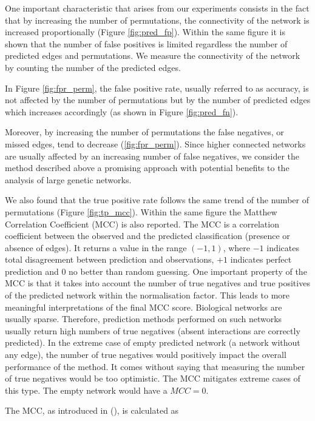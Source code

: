 One important characteristic that arises from our experiments consists in the fact that by increasing the number of permutations, the connectivity of the network is increased proportionally (Figure \ref{fig:pred_fp}). Within the same figure it is shown that the number of false positives is limited regardless the number of predicted edges and permutations.   
We measure the connectivity of the network by counting the number of the predicted edges. 

In Figure \ref{fig:fpr_perm}, the false positive rate, usually referred to as accuracy, is not affected by the number of permutations but by the number of predicted edges which increases accordingly (as shown in Figure \ref{fig:pred_fn}). 

Moreover, by increasing the number of permutations the false negatives, or missed edges, tend to decrease (\ref{fig:fpr_perm}). Since higher connected networks are usually affected by an increasing number of false negatives, we consider the method described above a promising approach with potential benefits to the analysis of large genetic networks. 

We also found that the true positive rate follows the same trend of the number of permutations (Figure \ref{fig:tp_mcc}). Within the same figure the Matthew Correlation Coefficient (MCC) is also reported. The MCC is a correlation coefficient between the observed and the predicted classification (presence or absence of edges). It returns a value in the range $(-1, 1)$, where $-1$ indicates total disagreement between prediction and observations, $+1$ indicates perfect prediction and $0$ no better than random guessing.
One important property of the MCC is that it takes into account the number of true negatives and true positives of the predicted network within the normalisation factor. This leads to more meaningful interpretations of the final MCC score. Biological networks are usually sparse. Therefore, prediction methods performed on such networks usually return high numbers of true negatives (absent interactions are correctly predicted). 
In the extreme case of empty predicted network (a network without any edge), the number of true negatives would positively impact the overall performance of the method. It comes without saying that measuring the number of true negatives would be too optimistic. The MCC mitigates extreme cases of this type. The empty network would have a $MCC = 0$. 

The MCC, as introduced in (\citealp{Matthews1975}), is calculated as 

